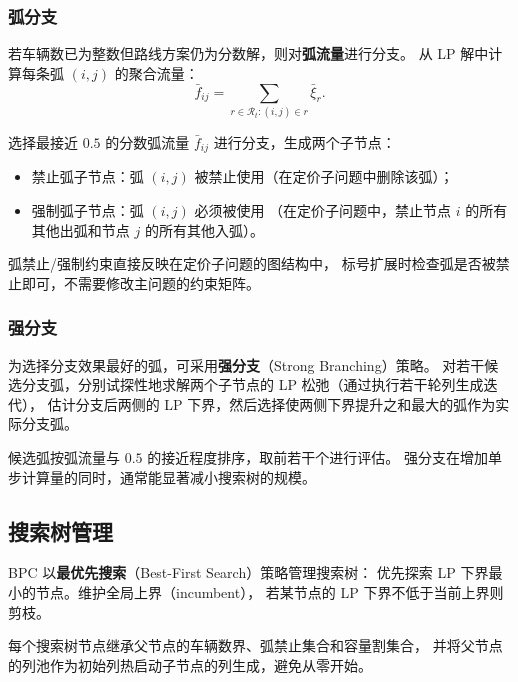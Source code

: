 \documentclass{article}
\begin{document}
\subsubsection{弧分支}

若车辆数已为整数但路线方案仍为分数解，则对\textbf{弧流量}进行分支。
从 LP 解中计算每条弧 $(i,j)$ 的聚合流量：
\begin{equation}
\bar{f}_{ij} = \sum_{r \in \mathcal{R}_t : (i,j) \in r} \bar\xi_r.
\end{equation}

选择最接近 $0.5$ 的分数弧流量 $\bar{f}_{ij}$ 进行分支，生成两个子节点：
\begin{itemize}[leftmargin=2em]
  \item 禁止弧子节点：弧 $(i,j)$ 被禁止使用（在定价子问题中删除该弧）；
  \item 强制弧子节点：弧 $(i,j)$ 必须被使用
    （在定价子问题中，禁止节点 $i$ 的所有其他出弧和节点 $j$ 的所有其他入弧）。
\end{itemize}

弧禁止/强制约束直接反映在定价子问题的图结构中，
标号扩展时检查弧是否被禁止即可，不需要修改主问题的约束矩阵。

\subsubsection{强分支}
\label{sec:strong_branching}

为选择分支效果最好的弧，可采用\textbf{强分支}（Strong Branching）策略。
对若干候选分支弧，分别试探性地求解两个子节点的 LP 松弛（通过执行若干轮列生成迭代），
估计分支后两侧的 LP 下界，然后选择使两侧下界提升之和最大的弧作为实际分支弧。

候选弧按弧流量与 $0.5$ 的接近程度排序，取前若干个进行评估。
强分支在增加单步计算量的同时，通常能显著减小搜索树的规模。

\subsection{搜索树管理}
\label{sec:tree}

BPC 以\textbf{最优先搜索}（Best-First Search）策略管理搜索树：
优先探索 LP 下界最小的节点。维护全局上界（incumbent），
若某节点的 LP 下界不低于当前上界则剪枝。

每个搜索树节点继承父节点的车辆数界、弧禁止集合和容量割集合，
并将父节点的列池作为初始列热启动子节点的列生成，避免从零开始。
\end{document}
